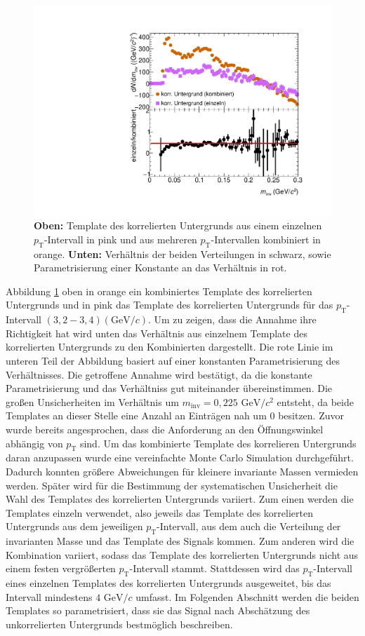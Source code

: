 \begin{figure}[tp]
\centering
\includegraphics[width=.7\linewidth]{BackgroundWithRatio10_Data_2016.pdf}
\caption{\textbf{Oben:} Template des korrelierten Untergrunds aus einem einzelnen $p_\text{T}$-Intervall in pink und aus mehreren $p_\text{T}$-Intervallen kombiniert in orange.
\textbf{Unten:} Verh\"altnis der beiden Verteilungen in schwarz, sowie Parametrisierung einer Konstante an das Verh\"altnis in rot.}
\label{fig:BkgTempRatio}
\end{figure}
\newline
Abbildung \ref{fig:BkgTempRatio} oben in orange ein kombiniertes Template des korrelierten Untergrunds und in pink das Template des korrelierten Untergrunds f\"ur das $p_\text{T}$-Intervall $(3,2 - 3,4) (\text{GeV/}c)$.
Um zu zeigen, dass die Annahme ihre Richtigkeit hat wird unten das Verh\"altnis aus einzelnem Template des korrelierten Untergrunds zu den Kombinierten dargestellt.
Die rote Linie im unteren Teil der Abbildung basiert auf einer konstanten Parametrisierung des Verh\"altnisses.
Die getroffene Annahme wird best\"atigt, da die konstante Parametrisierung und das Verh\"altniss gut miteinander \"ubereinstimmen.
Die gro{\ss}en Unsicherheiten im Verh\"altnis um $m_\text{inv} = 0,225\text{ GeV}/c^{2}$ entsteht, da beide Templates an dieser Stelle eine Anzahl an Eintr\"agen nah um 0 besitzen.
\newline
Zuvor wurde bereits angesprochen, dass die Anforderung an den \"Offnungswinkel abh\"angig von $p_\text{T}$ sind.
Um das kombinierte Template des korrelieren Untergrunds daran anzupassen wurde eine vereinfachte Monte Carlo Simulation durchgef\"uhrt.
Dadurch konnten gr\"o{\ss}ere Abweichungen f\"ur kleinere invariante Massen vermieden werden.
\newline
Sp\"ater wird f\"ur die Bestimmung der systematischen Unsicherheit die Wahl des Templates des korrelierten Untergrunds variiert.
Zum einen werden die Templates einzeln verwendet, also jeweils das Template des korrelierten Untergrunds aus dem jeweiligen $p_\text{T}$-Intervall, aus dem auch die Verteilung der invarianten Masse und das Template des Signals kommen.
Zum anderen wird die Kombination variiert, sodass das Template des korrelierten Untergrunds nicht aus einem festen vergr\"o{\ss}erten $p_\text{T}$-Intervall stammt.
Stattdessen wird das $p_\text{T}$-Intervall eines einzelnen Templates des korrelierten Untergrunds ausgeweitet, bis das Intervall mindestens $4\text{ GeV}/c$ umfasst.
\newline
Im Folgenden Abschnitt werden die beiden Templates so parametrisiert, dass sie das Signal nach Absch\"atzung des unkorrelierten Untergrunds bestm\"oglich beschreiben.
